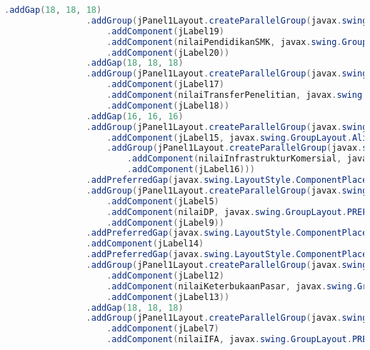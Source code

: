 \begin{lstlisting}[language=Java, caption=TampilanKondisiEksternal.java]
                .addGap(18, 18, 18)
                .addGroup(jPanel1Layout.createParallelGroup(javax.swing.GroupLayout.Alignment.BASELINE)
                    .addComponent(jLabel19)
                    .addComponent(nilaiPendidikanSMK, javax.swing.GroupLayout.PREFERRED_SIZE, javax.swing.GroupLayout.DEFAULT_SIZE, javax.swing.GroupLayout.PREFERRED_SIZE)
                    .addComponent(jLabel20))
                .addGap(18, 18, 18)
                .addGroup(jPanel1Layout.createParallelGroup(javax.swing.GroupLayout.Alignment.BASELINE)
                    .addComponent(jLabel17)
                    .addComponent(nilaiTransferPenelitian, javax.swing.GroupLayout.PREFERRED_SIZE, javax.swing.GroupLayout.DEFAULT_SIZE, javax.swing.GroupLayout.PREFERRED_SIZE)
                    .addComponent(jLabel18))
                .addGap(16, 16, 16)
                .addGroup(jPanel1Layout.createParallelGroup(javax.swing.GroupLayout.Alignment.LEADING)
                    .addComponent(jLabel15, javax.swing.GroupLayout.Alignment.TRAILING)
                    .addGroup(jPanel1Layout.createParallelGroup(javax.swing.GroupLayout.Alignment.BASELINE)
                        .addComponent(nilaiInfrastrukturKomersial, javax.swing.GroupLayout.PREFERRED_SIZE, javax.swing.GroupLayout.DEFAULT_SIZE, javax.swing.GroupLayout.PREFERRED_SIZE)
                        .addComponent(jLabel16)))
                .addPreferredGap(javax.swing.LayoutStyle.ComponentPlacement.UNRELATED)
                .addGroup(jPanel1Layout.createParallelGroup(javax.swing.GroupLayout.Alignment.BASELINE)
                    .addComponent(jLabel5)
                    .addComponent(nilaiDP, javax.swing.GroupLayout.PREFERRED_SIZE, javax.swing.GroupLayout.DEFAULT_SIZE, javax.swing.GroupLayout.PREFERRED_SIZE)
                    .addComponent(jLabel9))
                .addPreferredGap(javax.swing.LayoutStyle.ComponentPlacement.RELATED)
                .addComponent(jLabel14)
                .addPreferredGap(javax.swing.LayoutStyle.ComponentPlacement.UNRELATED)
                .addGroup(jPanel1Layout.createParallelGroup(javax.swing.GroupLayout.Alignment.BASELINE)
                    .addComponent(jLabel12)
                    .addComponent(nilaiKeterbukaanPasar, javax.swing.GroupLayout.PREFERRED_SIZE, javax.swing.GroupLayout.DEFAULT_SIZE, javax.swing.GroupLayout.PREFERRED_SIZE)
                    .addComponent(jLabel13))
                .addGap(18, 18, 18)
                .addGroup(jPanel1Layout.createParallelGroup(javax.swing.GroupLayout.Alignment.BASELINE)
                    .addComponent(jLabel7)
                    .addComponent(nilaiIFA, javax.swing.GroupLayout.PREFERRED_SIZE, javax.swing.GroupLayout.DEFAULT_SIZE, javax.swing.GroupLayout.PREFERRED_SIZE)

\end{lstlisting}
